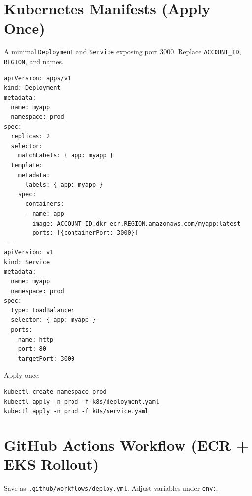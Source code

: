 \documentclass[11pt]{article}
\begin{document}
\section{Kubernetes Manifests (Apply Once)}
A minimal \texttt{Deployment} and \texttt{Service} exposing port 3000. Replace \texttt{ACCOUNT\_ID}, \texttt{REGION}, and names.
\begin{listing}[H]
\caption{deployment.yaml + service.yaml}
\begin{verbatim}
apiVersion: apps/v1
kind: Deployment
metadata:
  name: myapp
  namespace: prod
spec:
  replicas: 2
  selector:
    matchLabels: { app: myapp }
  template:
    metadata:
      labels: { app: myapp }
    spec:
      containers:
      - name: app
        image: ACCOUNT_ID.dkr.ecr.REGION.amazonaws.com/myapp:latest
        ports: [{containerPort: 3000}]
---
apiVersion: v1
kind: Service
metadata:
  name: myapp
  namespace: prod
spec:
  type: LoadBalancer
  selector: { app: myapp }
  ports:
  - name: http
    port: 80
    targetPort: 3000
\end{verbatim}
\end{listing}

Apply once:
\begin{verbatim}
kubectl create namespace prod
kubectl apply -n prod -f k8s/deployment.yaml
kubectl apply -n prod -f k8s/service.yaml
\end{verbatim}
\clearpage

\section{GitHub Actions Workflow (ECR + EKS Rollout)}
Save as \texttt{.github/workflows/deploy.yml}. Adjust variables under \texttt{env:}.
\end{document}

